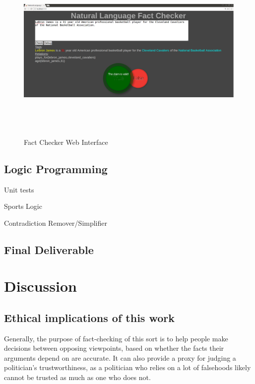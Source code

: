 \documentclass{chi2009}
\begin{document}
\begin{figure}
\includegraphics[width=\textwidth,height=9cm]{factcheck}
\caption{Fact Checker Web Interface}\label{imgWeb}
\end{figure}

\subsection{Logic Programming}

Unit tests

Sports Logic

Contradiction Remover/Simplifier

\subsection{Final Deliverable}

\section{Discussion}



\subsection{Ethical implications of this work}

Generally, the purpose of fact-checking of this sort is to help people make decisions between opposing viewpoints, based on whether the facts their arguments depend on are accurate.
It can also provide a proxy for judging a politician's trustworthiness, as a politician who relies on a lot of falsehoods likely cannot be trusted as much as one who does not.
\end{document}
